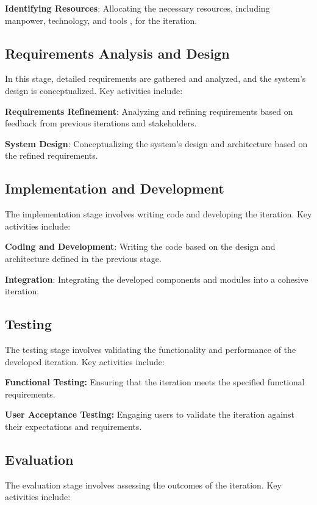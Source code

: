 \textbf{Identifying Resources}:
Allocating the necessary resources, including manpower, technology, and tools \citep{mittelbach2004latex}, for the iteration.

\subsection{Requirements Analysis and Design}

In this stage, detailed requirements are gathered and analyzed, and the system's design is conceptualized. Key activities include:

\textbf{Requirements Refinement}:
Analyzing and refining requirements based on feedback from previous iterations and stakeholders.

\textbf{System Design}:
Conceptualizing the system's design and architecture based on the refined requirements.

\subsection{Implementation and Development}

The implementation stage involves writing code and developing the iteration. Key activities include:

\textbf{Coding and Development}:
Writing the code based on the design and architecture defined in the previous stage.

\textbf{Integration}:
Integrating the developed components and modules into a cohesive iteration.

\subsection{Testing}

The testing stage involves validating the functionality and performance of the developed iteration. Key activities include:

\textbf{Functional Testing:}
Ensuring that the iteration meets the specified functional requirements.

\textbf{User Acceptance Testing:}
Engaging users to validate the iteration against their expectations and requirements.

\subsection{Evaluation}

The evaluation stage involves assessing the outcomes of the iteration. Key activities include:

